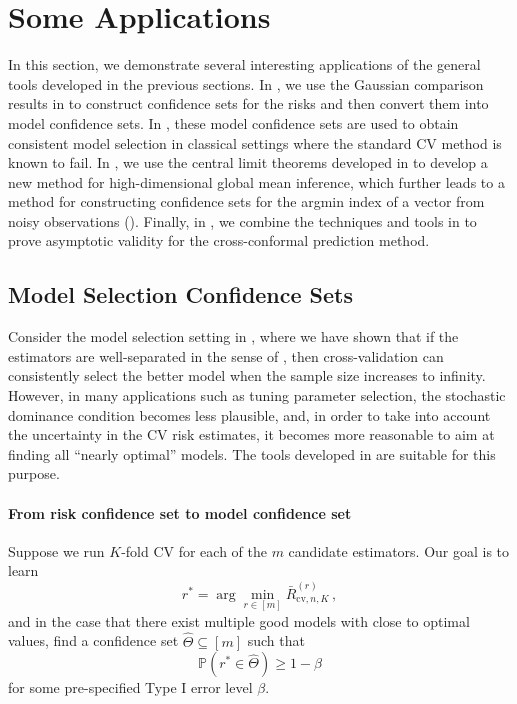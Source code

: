 \documentclass[11pt]{article}
\theoremstyle{plain}
\newcommand{\cv}{{\mathrm{cv}}}
\begin{document}
\section{Some Applications}\label{sec:5-applications}
In this section, we demonstrate several interesting applications of the general tools developed in the previous sections.
In , we use the Gaussian comparison results in  to construct confidence sets for the risks and then convert them into model confidence sets.  In , these model confidence sets are used to obtain consistent model selection in classical settings where the standard CV method is known to fail.
In , we use the central limit theorems developed in  to develop a new method for high-dimensional global mean inference, which further leads to a method for constructing confidence sets for the argmin index of a vector from noisy observations ().
Finally, in , we combine the techniques and tools in  to prove asymptotic validity for the cross-conformal prediction method.

\subsection{Model Selection Confidence Sets}\label{subsec:5.1-model-conf-set}
Consider the model selection setting in , where we have shown that if the estimators are well-separated in the sense of , then cross-validation can consistently select the better model when the sample size increases to infinity.  However, in many applications such as tuning parameter selection, the stochastic dominance condition becomes less plausible, and, in order to take into account the uncertainty in the CV risk estimates, it becomes more reasonable to aim at finding all ``nearly optimal'' models.  The tools developed in  are suitable for this purpose.

\paragraph{From risk confidence set to model confidence set}
Suppose we run $K$-fold CV for each of the $m$ candidate estimators. 
Our goal is to learn
\begin{equation}\label{eq:5.1-r^*-rand-center}
r^*=\arg\min_{r\in[m]} \bar R_{\cv,n,K}^{(r)}\,,
\end{equation}
and in the case that there exist multiple good models with close to optimal values, find a confidence set $\hat\Theta\subseteq[m]$ such that
\begin{equation}\label{eq:5.1-conf-set-def-rand}
\mathbb P(r^*\in \hat\Theta)\ge 1-\beta
\end{equation}
for some pre-specified Type I error level $\beta$.
\end{document}
